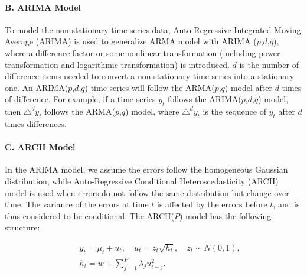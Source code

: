 \paragraph{B. ARIMA Model}
\vspace{-0.05in}
 To model the non-stationary time series data,  Auto-Regressive Integrated Moving Average (ARIMA)\cite{weisang2008vagaries} is used to generalize ARMA model with ARIMA ($p$,$d$,$q$), where  a difference factor or some nonlinear transformation (including power transformation and logarithmic transformation) is introduced. $d$ is the number of difference items needed to convert a non-stationary time series into a stationary one. An  ARIMA($p$,$d$,$q$) time series will follow the ARMA($p$,$q$) model after $d$ times of difference. For example, if a time series $y_t$ follows the ARIMA($p$,$d$,$q$) model, then $\triangle^d$$y_t$ follows the ARMA($p$,$q$) model, where $\triangle^d$$y_t$ is the sequence of $y_t$ after $d$ times differences. 
 
\paragraph{C. ARCH Model}
\vspace{-0.05in}
In the ARIMA model, we assume the errors follow the homogeneous Gaussian distribution, while Auto-Regressive Conditional Heteroscedasticity (ARCH) model\cite{engle1995arch} is used when errors do not follow the same distribution but change over time. The variance of the errors at time $t$ is affected by the errors before $t$, and  is thus considered to be conditional. The ARCH($P$) model has the following structure:

\begin{eqnarray}
&& y_t  =  \mu_t +  u_t,   \quad u_t = z_t{\sqrt{h_t}},\quad z_t\sim N(0,1), \nonumber\\
&& h_t = w+\sum_{j=1}^{P} {\lambda_j{u_{t-j}^2}}. 
\end{eqnarray}




